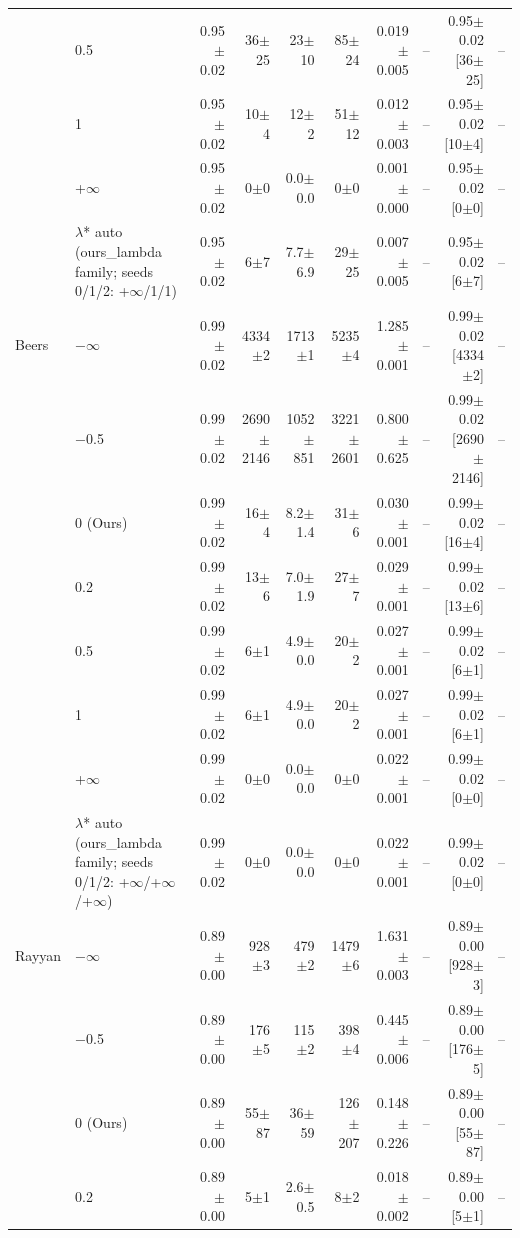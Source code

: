 {\begin{longtable}{llrrrrrrrr}
 & 0.5 & 0.95$\pm$0.02 & 36$\pm$25 & 23$\pm$10 & 85$\pm$24 & 0.019$\pm$0.005 & -- & 0.95$\pm$0.02 [36$\pm$25] & -- \\
 & 1 & 0.95$\pm$0.02 & 10$\pm$4 & 12$\pm$2 & 51$\pm$12 & 0.012$\pm$0.003 & -- & 0.95$\pm$0.02 [10$\pm$4] & -- \\
 & +$\infty$ & 0.95$\pm$0.02 & 0$\pm$0 & 0.0$\pm$0.0 & 0$\pm$0 & 0.001$\pm$0.000 & -- & 0.95$\pm$0.02 [0$\pm$0] & -- \\
 & $\lambda$* auto (ours\_lambda family; seeds 0/1/2: +$\infty$/1/1) & 0.95$\pm$0.02 & 6$\pm$7 & 7.7$\pm$6.9 & 29$\pm$25 & 0.007$\pm$0.005 & -- & 0.95$\pm$0.02 [6$\pm$7] & -- \\
\midrule
Beers & $-$$\infty$ & 0.99$\pm$0.02 & 4334$\pm$2 & 1713$\pm$1 & 5235$\pm$4 & 1.285$\pm$0.001 & -- & 0.99$\pm$0.02 [4334$\pm$2] & -- \\
 & $-$0.5 & 0.99$\pm$0.02 & 2690$\pm$2146 & 1052$\pm$851 & 3221$\pm$2601 & 0.800$\pm$0.625 & -- & 0.99$\pm$0.02 [2690$\pm$2146] & -- \\
 & 0 (Ours) & 0.99$\pm$0.02 & 16$\pm$4 & 8.2$\pm$1.4 & 31$\pm$6 & 0.030$\pm$0.001 & -- & 0.99$\pm$0.02 [16$\pm$4] & -- \\
 & 0.2 & 0.99$\pm$0.02 & 13$\pm$6 & 7.0$\pm$1.9 & 27$\pm$7 & 0.029$\pm$0.001 & -- & 0.99$\pm$0.02 [13$\pm$6] & -- \\
 & 0.5 & 0.99$\pm$0.02 & 6$\pm$1 & 4.9$\pm$0.0 & 20$\pm$2 & 0.027$\pm$0.001 & -- & 0.99$\pm$0.02 [6$\pm$1] & -- \\
 & 1 & 0.99$\pm$0.02 & 6$\pm$1 & 4.9$\pm$0.0 & 20$\pm$2 & 0.027$\pm$0.001 & -- & 0.99$\pm$0.02 [6$\pm$1] & -- \\
 & +$\infty$ & 0.99$\pm$0.02 & 0$\pm$0 & 0.0$\pm$0.0 & 0$\pm$0 & 0.022$\pm$0.001 & -- & 0.99$\pm$0.02 [0$\pm$0] & -- \\
 & $\lambda$* auto (ours\_lambda family; seeds 0/1/2: +$\infty$/+$\infty$/+$\infty$) & 0.99$\pm$0.02 & 0$\pm$0 & 0.0$\pm$0.0 & 0$\pm$0 & 0.022$\pm$0.001 & -- & 0.99$\pm$0.02 [0$\pm$0] & -- \\
\midrule
Rayyan & $-$$\infty$ & 0.89$\pm$0.00 & 928$\pm$3 & 479$\pm$2 & 1479$\pm$6 & 1.631$\pm$0.003 & -- & 0.89$\pm$0.00 [928$\pm$3] & -- \\
 & $-$0.5 & 0.89$\pm$0.00 & 176$\pm$5 & 115$\pm$2 & 398$\pm$4 & 0.445$\pm$0.006 & -- & 0.89$\pm$0.00 [176$\pm$5] & -- \\
 & 0 (Ours) & 0.89$\pm$0.00 & 55$\pm$87 & 36$\pm$59 & 126$\pm$207 & 0.148$\pm$0.226 & -- & 0.89$\pm$0.00 [55$\pm$87] & -- \\
 & 0.2 & 0.89$\pm$0.00 & 5$\pm$1 & 2.6$\pm$0.5 & 8$\pm$2 & 0.018$\pm$0.002 & -- & 0.89$\pm$0.00 [5$\pm$1] & -- \\

\end{longtable}}
